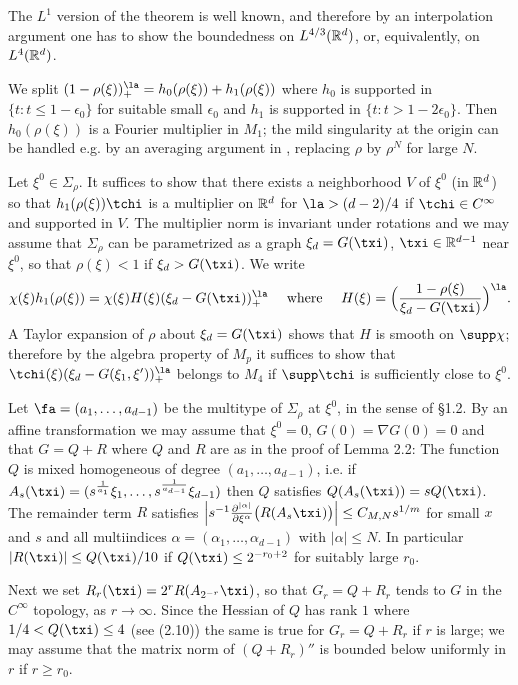 \endhead
The $L^1$ version of the theorem is well known, and therefore by an 
interpolation argument one has to show the boundedness on $L^{4/3}(\Bbb R^d)$,
or, equivalently, on $L^4(\Bbb R^d)$.


We split $(1-\rho(\xi))_+^\la= h_0(\rho(\xi))+h_1(\rho(\xi))$ where
$h_0$ is supported in $\{t:t\le 1-\epsilon_0\}$ for suitable
small $\epsilon_0$ and 
$h_1$ is supported in $\{t:t> 1-2\epsilon_0\}$. Then
 $h_0(\rho(\xi))$ is a Fourier
 multiplier in $M_1$; the mild singularity at the origin can be handled  e.g.
by an averaging
argument in \cite{8, p. 248}, replacing $\rho$ by $\rho^N$ for large $N$.

Let $\xi^0\in \Sigma_\rho$. It suffices to show that there exists a 
neighborhood $V$ of $\xi^0$ (in $\Bbb R^d$) so that
$h_1(\rho(\xi))\tchi$ is a multiplier 
on $\Bbb R^d$ for $\la>(d-2)/4$ if $\tchi\in C^\infty$ and supported in
$V$. 
The multiplier norm is invariant under rotations and we may assume that
$\Sigma_\rho$ can be parametrized as a graph
$\xi_d=G(\txi)$, $\txi\in \Bbb R^{d-1}$ 
near $\xi^0$, so that $\rho(\xi)<1$ if $\xi_d>G(\txi)$.
We write
$$
\chi(\xi)h_1(\rho(\xi))=\chi(\xi) H(\xi) 
(\xi_d-G(\txi))_+^\la
\quad\text{ where } \quad
H(\xi)= \Big( \frac{1-\rho(\xi)}{\xi_d-G(\txi)}\Big)^\la.
$$
A Taylor expansion of $\rho$ about $\xi_d=G(\txi)$ shows that
 $H$ is smooth on $\supp \chi$; therefore by the algebra property 
of $M_p$ it suffices to show that
$\tchi(\xi) 
(\xi_d-G(\xi_1,\xi'))_+^\la$ belongs to $M_4$ if 
$\supp \tchi$ is sufficiently close to $\xi^0$.

Let $\fa=(a_1,\dots, a_{d-1})$ be the multitype of $\Sigma_\rho$ at $\xi^0$, in the sense 
of \S 1.2.
By an affine transformation 
we may assume that $\xi^0=0$, $G(0)=\nabla G(0)=0$ and that 
$G=Q+R$ where $Q$ and $R$ are as in the proof of Lemma 2.2: The function  $Q$ is mixed homogeneous of degree
$(a_1,\dots, a_{d-1})$,
i.e. if
$A_s(\txi)=
(s^{\frac{1}{a_1}} \xi_1 , \dots , s^{\frac{1}{a_{d-1}}} \xi_{d-1} )$
then $Q$ satisfies $Q(A_s(\txi))=s Q(\txi)$. The remainder term $R$ satisfies
$
\Big|s^{-1}\frac{\partial^{|\alpha |}}
{ \partial \xi^\alpha}\big(R(A_s \txi)\big) \Big| \le C_{M, N} s^{1/m}
$
 for small $x$ and $s$ and  all multiindices $\alpha=(\alpha_1,\dots, \alpha_{d-1})$ 
with $|\alpha|\le  N$.  In particular 
$|R(\txi)|\le
Q(\txi)/10$ if $Q(\txi)\le 2^{-r_0+2}$ for suitably large $r_0$.

Next we set $R_r(\txi) =2^r R(A_{2^{-r}}\txi)$, so that
$G_r=Q+R_r$ tends to $G$ in the $C^\infty$ topology,
 as $r\to\infty$.
Since the  Hessian of $Q$ has rank $1$ where $1/4<Q(\txi)\le 4$ 
(see (2.10)) the same is
true for $G_r=Q+R_r$ if $r$ is large; we may assume that the matrix norm of
$(Q+R_r)''$ is bounded below uniformly in $r$ if $r\ge r_0$.
 

